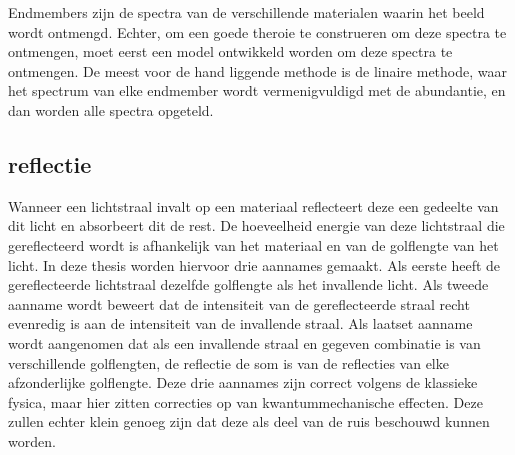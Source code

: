 \documentclass[12pt]{report}
\begin{document}
Endmembers zijn de spectra van de verschillende materialen waarin het beeld wordt ontmengd. Echter, om een goede theroie te construeren om deze spectra te ontmengen, moet eerst een model ontwikkeld worden om deze spectra te ontmengen. De meest voor de hand liggende methode is de linaire methode, waar het spectrum van elke endmember wordt vermenigvuldigd met de abundantie, en dan worden alle spectra opgeteld. 

\subsection{reflectie}


Wanneer een lichtstraal invalt op een materiaal reflecteert deze een gedeelte van dit licht en absorbeert dit de rest. De hoeveelheid energie van deze lichtstraal die gereflecteerd wordt is afhankelijk van het materiaal en van de golflengte van het licht. In deze thesis worden hiervoor drie aannames gemaakt. Als eerste heeft de gereflecteerde lichtstraal dezelfde golflengte als het invallende licht. Als tweede aanname wordt beweert dat de intensiteit van de gereflecteerde straal recht evenredig is aan de intensiteit van de invallende straal. Als laatset aanname wordt aangenomen dat als een invallende straal en gegeven combinatie is van verschillende golflengten, de reflectie de som is van de reflecties van elke afzonderlijke golflengte. Deze drie aannames zijn correct volgens de klassieke fysica, maar hier zitten correcties op van kwantummechanische effecten. Deze zullen echter klein genoeg zijn dat deze als deel van de ruis beschouwd kunnen worden.
\end{document}
